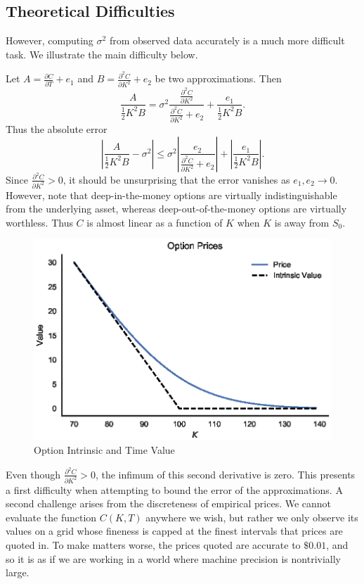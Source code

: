 \documentclass[12pt]{article}
\numberwithin{equation}{section}
\newcommand{\diff}[2]{\frac{\partial #1}{\partial #2}}
\newcommand{\abs}[1]{\left|#1\right|}
\begin{document}
\subsection{Theoretical Difficulties}
However, computing $\sigma^2$ from observed data accurately is a much more
difficult task. We illustrate the main difficulty below.

Let $A = \diff{C}{T} + e_1$ and $B = \diff{^2C}{K^2} + e_2$ be two approximations. Then \[
\frac{A}{\frac{1}{2}K^2 B} = \sigma^2 \frac{\diff{^2C}{K^2}}{\diff{^2C}{K^2} + e_2} + \frac{e_1}{\frac{1}{2}K^2 B}.
\]
Thus the absolute error \[
\abs{\frac{A}{\frac{1}{2}K^2 B} - \sigma^2} \le \sigma^2 \abs{\frac{e_2}{\diff{^2C}{K^2}+e_2}} + \abs{\frac{e_1}{\frac{1}{2}K^2B}}.
\]
Since $\diff{^2C}{K^2} > 0$, it should be unsurprising that the error vanishes
as $e_1,e_2 \to 0$. However, note that deep-in-the-money options are virtually
indistinguishable from the underlying asset, whereas deep-out-of-the-money
options are virtually worthless. Thus $C$ is almost linear as a function of $K$
when $K$ is away from $S_0$.

\begin{figure}[h]
\centering
\includegraphics{figs/intrinsicvalue}
\caption{Option Intrinsic and Time Value}
\label{fig:intrinsicvalue}
\end{figure}

Even though $\diff{^2C}{K^2} > 0$, the infimum of this second derivative is
zero. This presents a first difficulty when attempting to bound the error of the
approximations. A second challenge arises from the discreteness of empirical
prices. We cannot evaluate the function $C(K,T)$ anywhere we wish, but rather we
only observe its values on a grid whose fineness is capped at the finest
intervals that prices are quoted in. To make matters worse, the prices quoted
are accurate to $\$0.01$, and so it is as if we are working in a world where
machine precision is nontrivially large.
\end{document}
